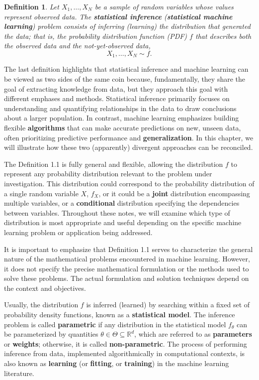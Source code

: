 \documentclass{report}
\newtheorem{definition}{Definition}[chapter]
\begin{document}
\begin{definition}
Let $X_1,\dots,X_N$ be a sample of random variables whose values represent observed data. The \textbf{statistical inference} (\textbf{statistical machine learning}) problem consists of inferring (learning) the distribution that generated the data; that is, the probability distribution function (PDF) $f$ that describes both the observed data and the not-yet-observed data,
\begin{equation*}
X_1,\dots,X_N \sim f.
\end{equation*}
\end{definition}

The last definition highlights that statistical inference and machine learning can be viewed as two sides of the same coin because, fundamentally, they share the goal of extracting knowledge from data, but they approach this goal with different emphases and methods.  Statistical inference primarily focuses on understanding and quantifying relationships in the data to draw conclusions about a larger population. In contrast, machine learning emphasizes building flexible \textbf{algorithms} that can make accurate predictions on new, unseen data, often prioritizing predictive performance and \textbf{generalization}. In this chapter, we will illustrate how these two (apparently) divergent approaches can be reconciled.

The Definition 1.1 is fully general and flexible, allowing the distribution $f$ to represent any probability distribution relevant to the problem under investigation. This distribution could correspond to the probability distribution of a single random variable $X$, $f_X$, or it could be a \textbf{joint} distribution encompassing multiple variables, or a \textbf{conditional} distribution specifying the dependencies between variables. Throughout these notes, we will examine which type of distribution is most appropriate and useful depending on the specific machine learning problem or application being addressed.

It is important to emphasize that Definition 1.1 serves to characterize the general nature of the mathematical problems encountered in machine learning. However, it does not specify the precise mathematical formulation or the methods used to solve these problems. The actual formulation and solution techniques depend on the context and objectives.

Usually, the distribution $f$ is inferred (learned) by searching within a fixed set of probability density functions, known as a \textbf{statistical model}. The inference problem is called \textbf{parametric} if any distribution in the statistical model $f_\theta$ can be parameterized by quantities $\theta \in \Theta \subseteq \mathbb{R}^d$, which are referred to as \textbf{parameters} or \textbf{weights}; otherwise, it is called \textbf{non-parametric}. The process of performing inference from data, implemented algorithmically in computational contexts, is also known as \textbf{learning} (or \textbf{fitting}, or \textbf{training}) in the machine learning literature.
\end{document}
